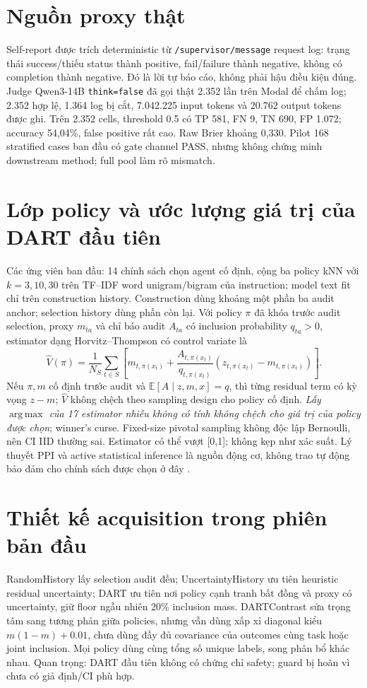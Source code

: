 \documentclass[11pt,a4paper,openany]{book}
\newcommand{\E}{\mathbb E}\newcommand{\Var}{\operatorname{Var}}\newcommand{\Cov}{\operatorname{Cov}}\newcommand{\Ind}{\mathbb I}\newcommand{\argmax}{\operatorname*{arg\,max}}\newcommand{\argmin}{\operatorname*{arg\,min}}
\begin{document}
\section{Nguồn proxy thật}
Self-report được trích deterministic từ \texttt{/supervisor/message} request log: trạng thái success/thiếu status thành positive, fail/failure thành negative, không có completion thành negative. Đó là lời tự báo cáo, không phải hậu điều kiện đúng. Judge Qwen3-14B \texttt{think=false} đã gọi thật 2.352 lần trên Modal để chấm log; 2.352 hợp lệ, 1.364 log bị cắt, 7.042.225 input tokens và 20.762 output tokens được ghi. Trên 2.352 cells, threshold 0.5 có TP 581, FN 9, TN 690, FP 1.072; accuracy 54,04\%, false positive rất cao. Raw Brier khoảng 0,330. Pilot 168 stratified cases ban đầu có gate channel PASS, nhưng không chứng minh downstream method; full pool làm rõ mismatch.

\section{Lớp policy và ước lượng giá trị của DART đầu tiên}
Các ứng viên ban đầu: 14 chính sách chọn agent cố định, cộng ba policy kNN với \(k=3,10,30\) trên TF--IDF word unigram/bigram của instruction; model text fit chỉ trên construction history. Construction dùng khoảng một phần ba audit anchor; selection history dùng phần còn lại. Với policy \(\pi\) đã khóa trước audit selection, proxy \(m_{ta}\) và chỉ báo audit \(A_{ta}\) có inclusion probability \(q_{ta}>0\), estimator dạng Horvitz--Thompson có control variate là
\begin{equation}\label{eq:ppi}\widehat V(\pi)=\frac1{N_S}\sum_{t\in S}\left[m_{t,\pi(x_t)}+\frac{A_{t,\pi(x_t)}}{q_{t,\pi(x_t)}}(z_{t,\pi(x_t)}-m_{t,\pi(x_t)})\right].
\end{equation}
Nếu \(\pi,m\) cố định trước audit và \(\E[A\mid z,m,x]=q\), thì từng residual term có kỳ vọng \(z-m\); \(\widehat V\) không chệch theo sampling design cho policy cố định. \emph{Lấy \(\argmax\) của 17 estimator nhiễu không có tính không chệch cho giá trị của policy được chọn}; winner's curse. Fixed-size pivotal sampling không độc lập Bernoulli, nên CI IID thường sai. Estimator có thể vượt [0,1]; không kẹp như xác suất. Lý thuyết PPI và active statistical inference là nguồn động cơ, không trao tự động bảo đảm cho chính sách được chọn ở đây \cite{ppi,asi}.

\section{Thiết kế acquisition trong phiên bản đầu}
RandomHistory lấy selection audit đều; UncertaintyHistory ưu tiên heuristic residual uncertainty; DART ưu tiên nơi policy cạnh tranh bất đồng và proxy có uncertainty, giữ floor ngẫu nhiên 20\% inclusion mass. DARTContrast sửa trọng tâm sang tương phản giữa policies, nhưng vẫn dùng xấp xỉ diagonal kiểu \(m(1-m)+0.01\), chưa dùng đầy đủ covariance của outcomes cùng task hoặc joint inclusion. Mọi policy dùng cùng tổng số unique labels, song phân bổ khác nhau. Quan trọng: DART đầu tiên không có chứng chỉ safety; guard bị hoãn vì chưa có giả định/CI phù hợp.
\end{document}
